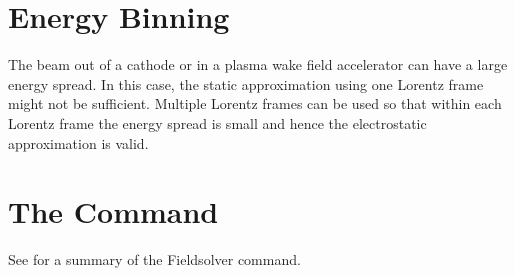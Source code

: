 \section{Energy Binning}
The beam out of a cathode or in a plasma wake field accelerator can have a large energy spread.
In this case, the static approximation using one Lorentz frame might not be sufficient. Multiple
Lorentz frames  can be used so that within each Lorentz frame the energy
spread is small and hence the electrostatic approximation is valid.
 \latermore

\section{The  Command}
\label{sec:fieldsolvercmd}
See  for a summary of the Fieldsolver command.
